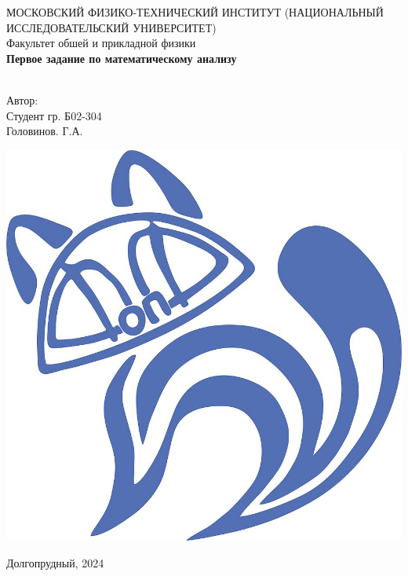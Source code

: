 \begin{titlepage}
	\begin{center}
		МОСКОВСКИЙ ФИЗИКО-ТЕХНИЧЕСКИЙ ИНСТИТУТ (НАЦИОНАЛЬНЫЙ ИССЛЕДОВАТЕЛЬСКИЙ УНИВЕРСИТЕТ) \\
		
		
		\hfill \break
		Факультет обшей и прикладной физики\\
		\vspace{2.5cm}
		\large{\textbf{Первое задание по математическому анализу}}\\
		\hfill \break
		\\
	\end{center}
	
	\begin{flushright}
		Автор:\\
		Студент гр. Б02-304\\
		Головинов. Г.А.
	\end{flushright}
	
	\vspace{7cm}
	
	\begin{center}
		\includegraphics[width=0.15\linewidth]{uni}
	\end{center}
	
	
	
	
	\vfill
	
	\begin{center} Долгопрудный, 2024 \end{center}
	
	\thispagestyle{empty}
	
\end{titlepage}